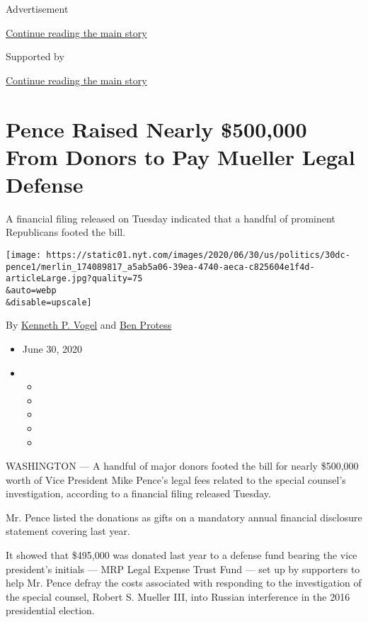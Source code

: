 Advertisement

\protect\hyperlink{after-top}{Continue reading the main story}

Supported by

\protect\hyperlink{after-sponsor}{Continue reading the main story}

\hypertarget{pence-raised-nearly-500000-from-donors-to-pay-mueller-legal-defense}{%
\section{Pence Raised Nearly \$500,000 From Donors to Pay Mueller Legal
Defense}\label{pence-raised-nearly-500000-from-donors-to-pay-mueller-legal-defense}}

A financial filing released on Tuesday indicated that a handful of
prominent Republicans footed the bill.

\texttt{[image: https://static01.nyt.com/images/2020/06/30/us/politics/30dc-pence1/merlin\_174089817\_a5ab5a06-39ea-4740-aeca-c825604e1f4d-articleLarge.jpg?quality=75\\\&auto=webp\\\&disable=upscale]}

By \href{https://www.nytimes.com/by/kenneth-p-vogel}{Kenneth P. Vogel}
and \href{https://www.nytimes.com/by/ben-protess}{Ben Protess}

\begin{itemize}
\item
  June 30, 2020
\item
  \begin{itemize}
  \item
  \item
  \item
  \item
  \item
  \end{itemize}
\end{itemize}

WASHINGTON --- A handful of major donors footed the bill for nearly
\$500,000 worth of Vice President Mike Pence's legal fees related to the
special counsel's investigation, according to a financial filing
released Tuesday.

Mr. Pence listed the donations as gifts on a mandatory annual financial
disclosure statement covering last year.

It showed that \$495,000 was donated last year to a defense fund bearing
the vice president's initials --- MRP Legal Expense Trust Fund --- set
up by supporters to help Mr. Pence defray the costs associated with
responding to the investigation of the special counsel, Robert S.
Mueller III, into Russian interference in the 2016 presidential
election.

